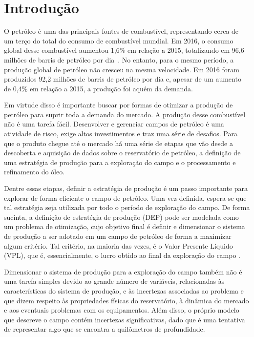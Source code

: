 
\chapter{Introdução}
\label{ch:1_Introducao}
O petróleo é uma das principais fontes de combustível, representando cerca de um terço do total do consumo de combustível mundial. Em 2016, o consumo global desse combustível aumentou 1,6\% em relação a 2015, totalizando em 96,6 milhões de barris de petróleo por dia~\cite{BritishPetroleum2017, ANP2017}. No entanto, para o mesmo período, a produção global de petróleo não cresceu na mesma velocidade. Em 2016 foram produzidos 92,2 milhões de barris de petróleo por dia e, apesar de um aumento de 0,4\% em relação a 2015, a produção foi aquém da demanda.

Em virtude disso é importante buscar por formas de otimizar a produção de petróleo para suprir toda a demanda do mercado. A produção desse combustível não é uma tarefa fácil. Desenvolver e gerenciar campos de petróleo é uma atividade de risco, exige altos investimentos e traz uma série de desafios. Para que o produto chegue até o mercado há uma série de etapas que vão desde a descoberta e aquisição de dados sobre o reservatório de petróleo, a definição de uma estratégia de produção para a exploração do campo e o processamento e refinamento do óleo\cite{ANP2017}.

Dentre essas etapas, definir a estratégia de produção é um passo importante para explorar de forma eficiente o campo de petróleo. Uma vez definida, espera-se que tal estratégia seja utilizada por todo o período de exploração do campo. De forma sucinta, a definição de estratégia de produção (DEP) pode ser modelada como um problema de otimização, cujo objetivo final é definir e dimensionar o sistema de produção a ser adotado em um campo de petróleo de forma a maximizar algum critério. Tal critério, na maioria das vezes, é o Valor Presente Líquido (VPL), que é, essencialmente, o lucro obtido ao final da exploração do campo \cite{Marques2012}.

Dimensionar o sistema de produção para a exploração do campo também não é uma tarefa simples devido ao grande número de variáveis, relacionadas às características do sistema de produção, e às incertezas associadas ao problema e que dizem respeito às propriedades físicas do reservatório, à dinâmica do mercado e aos eventuais problemas com os equipamentos. Além disso, o próprio modelo que descreve o campo contém incertezas significativas, dado que é uma tentativa de representar algo que se encontra a quilômetros de profundidade.

